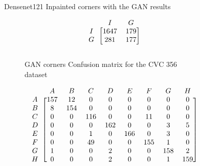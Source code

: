 \begin{figure}
\caption{Densenet121 Inpainted corners with the GAN results}
\myfontsize
\caption*{\footnotesize \textmd{ \textbf{A}:{dyed-lifted-polyps} , \textbf{B}:{dyed-resection-margins} , \textbf{C}:{esophagitis} , \textbf{D}:{normal-cecum} , \textbf{E}:{normal-pylorus} , \textbf{F}:{normal-z-line} , \textbf{G}:{polyps} , \textbf{H}:{ulcerative-colitis} , \textbf{I}:{non-polyp}}}

\begin{subfigure}[b]{0.25\textwidth}
     
\[
\begin{blockarray}{ccc}
& I & G  \\
\begin{block}{c[cc]}
        I&1647 &  179\\
        G& 281 &  177\\
\end{block}
\end{blockarray}
 \]         

\caption{GAN corners Confusion matrix for the CVC 356 dataset}
\label{mat:cvc356_CM_DN121_GAN_CORNER}
\end{subfigure}
\begin{subfigure}[b]{0.49\textwidth}  
\scriptsize     
\[
\begin{blockarray}{ccccccccc}
& A & B & C & D & E & F & G & H \\
\begin{block}{c[cccccccc]}
A&157 & 12 & 0 & 0 & 0 & 0 & 0 & 0\\
B&  8 & 154 & 0 & 0 & 0 & 0 & 0 & 0\\
C&  0 & 0 & 116 & 0 & 0 & 11 & 0 & 0\\
D&  0 & 0 & 0 & 162 & 0 & 0 & 3 & 5\\
E&  0 & 0 & 1 & 0 & 166 & 0 & 3 & 0\\
F&  0 & 0 & 49 & 0 & 0 & 155 & 1 & 0\\
G&  1 & 0 & 0 & 2 & 0 & 0 & 158 & 2\\
H&  0 & 0 & 0 & 2 & 0 & 0 & 1 & 159\\
\end{block}
\end{blockarray}
 \]        
        

\end{subfigure}
\end{figure}
